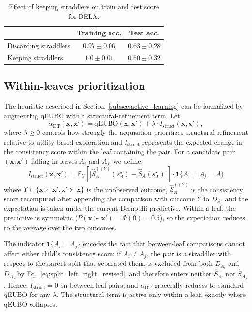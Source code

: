 \documentclass{article}
\begin{document}
\begin{table}[]
    \caption{Effect of keeping straddlers on train and test score for BELA.}
    \centering
\begin{tabular}{lcc} 
    \toprule
    & Training acc. & Test acc. \\
    \midrule
    Discarding straddlers &$ 0.97 \pm 0.06$ & $0.63 \pm 0.28$ \\
    Keeping straddlers & $1.0 \pm 0.01$ & $0.60 \pm 0.32$ \\
    \bottomrule
\end{tabular}

    \label{tab:straddlers_bela}
\end{table}
\subsection{Within-leaves prioritization}
\label{subsec:within-leaves}
The heuristic described in Section~\ref{subsec:active_learning} can be formalized by augmenting qEUBO with a structural-refinement term. Let
$$
\alpha_{\text{DT}}(\mathbf{x},\mathbf{x}') =
\text{qEUBO}(\mathbf{x},\mathbf{x}') +
\lambda \cdot I_{\text{struct}}(\mathbf{x},\mathbf{x}'),
$$
where $\lambda \geq 0$ controls how strongly the acquisition prioritizes structural refinement relative to utility-based exploration and
 $I_{\text{struct}}$ represents the expected change in the consistency score within the leaf containing the pair. 
For a candidate pair $(\mathbf{x},\mathbf{x}')$ falling in leaves $A_i$ and $A_j$, we define:
$$I_{\text{struct}}(\mathbf{x},\mathbf{x}') = \mathbb{E}_Y\!\left[\big|\widehat{S}_A^{(+Y)}(s_A^\star) - \widehat{S}_A(s_A^\star)\big|\right]\cdot\mathbf{1}\{A_i = A_j = A\}$$
where $Y\in\{\mathbf{x}\succ\mathbf{x}',\mathbf{x}'\succ\mathbf{x}\}$ is the unobserved outcome, $\widehat{S}_A^{(+Y)}$ is the consistency score recomputed after appending the comparison with outcome $Y$ to $D_A$, and the expectation is taken under the current Bernoulli predictive. Within a leaf, the predictive is symmetric ($P(\mathbf{x}\succ\mathbf{x}')=\Phi(0)=0.5$), so the expectation reduces to the average over the two outcomes.

The indicator $\mathbf{1}\{A_i=A_j\}$ encodes the fact that between-leaf comparisons cannot affect either child's consistency score: if $A_i\neq A_j$, the pair is a straddler with respect to the parent split that separated them, is excluded from both $D_{A_i}$ and $D_{A_j}$ by Eq.~\ref{eq:split_left_right_revised}, and therefore enters neither $\widehat{S}_{A_i}$ nor $\widehat{S}_{A_j}$. Hence, $I_{\text{struct}}=0$ on between-leaf pairs, and $\alpha_{\text{DT}}$ gracefully reduces to standard qEUBO for any $\lambda$. The structural term is active only within a leaf, exactly where qEUBO collapses.
\end{document}
